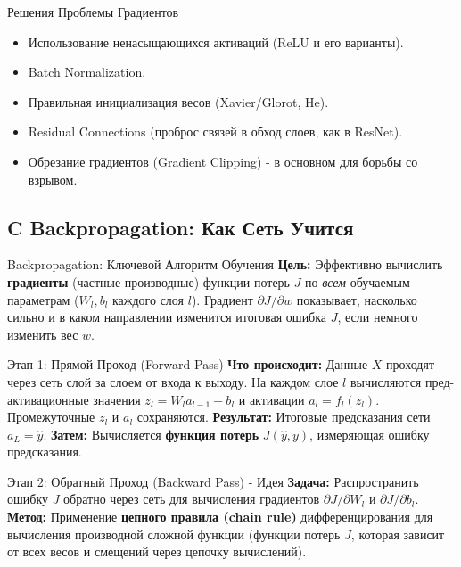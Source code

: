 \begin{myexampleblock}{Решения Проблемы Градиентов}
    \begin{itemize}[nosep, leftmargin=*]
        \item Использование ненасыщающихся активаций (ReLU и его варианты).
        \item Batch Normalization.
        \item Правильная инициализация весов (Xavier/Glorot, He).
        \item Residual Connections (проброс связей в обход слоев, как в ResNet).
        \item Обрезание градиентов (Gradient Clipping) - в основном для борьбы со взрывом.
    \end{itemize}
\end{myexampleblock}

\subsection{C Backpropagation: Как Сеть Учится}

\begin{alerttextbox}{Backpropagation: Ключевой Алгоритм Обучения}
    \textbf{Цель:} Эффективно вычислить \textbf{градиенты} (частные производные) функции потерь $J$ по \textit{всем} обучаемым параметрам ($W_l, b_l$ каждого слоя $l$). Градиент $\partial J / \partial w$ показывает, насколько сильно и в каком направлении изменится итоговая ошибка $J$, если немного изменить вес $w$.
\end{alerttextbox}

\begin{myblock}{Этап 1: Прямой Проход (Forward Pass)}
    \textbf{Что происходит:} Данные $X$ проходят через сеть слой за слоем от входа к выходу. На каждом слое $l$ вычисляются пред-активационные значения $z_l = W_l a_{l-1} + b_l$ и активации $a_l = f_l(z_l)$. Промежуточные $z_l$ и $a_l$ сохраняются.
    \textbf{Результат:} Итоговые предсказания сети $a_L = \hat{y}$.
    \textbf{Затем:} Вычисляется \textbf{функция потерь} $J(\hat{y}, y)$, измеряющая ошибку предсказания.
\end{myblock}

\begin{myblock}{Этап 2: Обратный Проход (Backward Pass) - Идея}
    \textbf{Задача:} Распространить ошибку $J$ обратно через сеть для вычисления градиентов $\partial J / \partial W_l$ и $\partial J / \partial b_l$.
    \textbf{Метод:} Применение \textbf{цепного правила (chain rule)} дифференцирования для вычисления производной сложной функции (функции потерь $J$, которая зависит от всех весов и смещений через цепочку вычислений).
\end{myblock}

